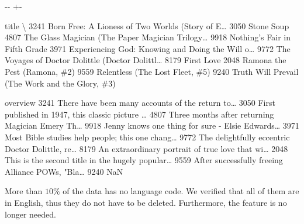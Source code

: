 \documentclass[letterpaper,10pt,english]{sphinxmanual}
\newlength\nbsphinxcodecellspacing
\begin{document}
{

\kern-\sphinxverbatimsmallskipamount\kern-\baselineskip
\kern+\FrameHeightAdjust\kern-\fboxrule
\vspace{\nbsphinxcodecellspacing}

\begin{sphinxVerbatim}[commandchars=\\\{\}]
\llap{\color{nbsphinxout}[19]:\,\hspace{\fboxrule}\hspace{\fboxsep}}                                                  title  \textbackslash{}
3241  Born Free: A Lioness of Two Worlds (Story of E{\ldots}
3050                                         Stone Soup
4807  The Glass Magician (The Paper Magician Trilogy{\ldots}
9918                      Nothing's Fair in Fifth Grade
3971  Experiencing God: Knowing and Doing the Will o{\ldots}
9772  The Voyages of Doctor Dolittle (Doctor Dolittl{\ldots}
8179                                         First Love
2048                       Ramona the Pest (Ramona, \#2)
9559                    Relentless (The Lost Fleet, \#5)
9240    Truth Will Prevail (The Work and the Glory, \#3)

                                               overview
3241  There have been many accounts of the return to{\ldots}
3050  First published in 1947, this classic picture {\ldots}
4807  Three months after returning Magician Emery Th{\ldots}
9918  Jenny knows one thing for sure - Elsie Edwards{\ldots}
3971  Most Bible studies help people; this one chang{\ldots}
9772  The delightfully eccentric Doctor Dolittle, re{\ldots}
8179  An extraordinary portrait of true love that wi{\ldots}
2048  This is the second title in the hugely popular{\ldots}
9559  After successfully freeing Alliance POWs, "Bla{\ldots}
9240                                                NaN
\end{sphinxVerbatim}
}

More than \(10\%\) of the data has no language code. We verified that all of them are in English, thus they do not have to be deleted. Furthermore, the  feature is no longer needed.
\end{document}
